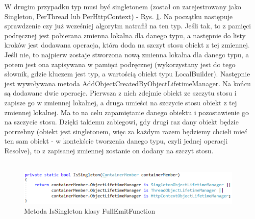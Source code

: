 \documentclass[12pt]{article}
\begin{document}
W drugim przypadku typ musi być singletonem (został on zarejestrowany jako Singleton, PerThread lub PerHttpContext) -  Rys. \ref{fig:FullEmitFunction_IsSingleton}. Na początku następuje sprawdzenie czy już wcześniej algorytm natrafił na ten typ. Jeśli tak, to z pamięci podręcznej jest pobierana zmienna lokalna dla danego typu, a następnie do listy kroków jest dodawana operacja, która doda na szczyt stosu obiekt z tej zmiennej. Jeśli nie, to najpierw zostaje stworzona nową zmienna lokalna dla danego typu, a potem jest ona zapisywana w pamięci podręcznej (wykorzystany jest do tego słownik, gdzie kluczem jest typ, a wartością obiekt typu LocalBuilder). Następnie jest wywoływana metoda AddObjectCreatedByObjectLifetimeManager. Na końcu są dodawane dwie operacje. Pierwsza z nich zdejmie obiekt ze szczytu stosu i zapisze go w zmiennej lokalnej, a druga umieści na szczycie stosu obiekt z tej zmiennej lokalnej. Ma to na celu zapamiętanie danego obiektu i pozostawienie go na szczycie stosu. Dzięki takiemu zabiegowi, gdy drugi raz dany obiekt  będzie potrzebny (obiekt jest singletonem, więc za każdym razem będziemy chcieli mieć ten sam obiekt - w kontekście tworzenia danego typu, czyli jednej operacji Resolve), to z zapisanej zmiennej zostanie on dodany na szczyt stosu.\\ \\
\begin{figure}[H]
	\begin{center}
  		\includegraphics{FullEmitFunction_IsSingleton.png}
  		\caption{Metoda IsSingleton klasy FullEmitFunction}
  		\label{fig:FullEmitFunction_IsSingleton}
	\end{center}
\end{figure}
\end{document}
